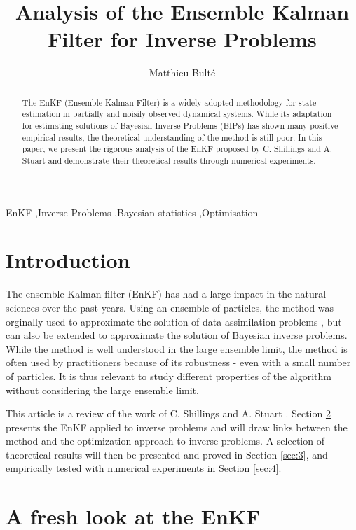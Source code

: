 \documentclass[a4paper,12pt]{elsarticle}
\begin{document}
\begin{frontmatter}

\title{Analysis of the Ensemble Kalman Filter for Inverse Problems}
\author{Matthieu Bulté}
\address{Technische Universität München}

\begin{abstract}
The EnKF (Ensemble Kalman Filter) is a widely adopted methodology
for state estimation in partially and noisily observed dynamical systems. While
its adaptation for estimating solutions of Bayesian Inverse Problems (BIPs)
has shown many positive empirical results, the theoretical understanding of
the method is still poor. In this paper, we present the rigorous analysis of
the EnKF proposed by C. Shillings and A. Stuart \cite{schillings2017analysis} and demonstrate their
theoretical results through numerical experiments.
\end{abstract}
\begin{keyword}
EnKF \sep Inverse Problems \sep Bayesian statistics \sep Optimisation
\end{keyword}
\end{frontmatter}

\section{Introduction} \label{sec:1} 
The ensemble Kalman filter (EnKF) has had a large impact in the
natural sciences over the past years. Using an ensemble of particles,
the method was orginally used to approximate the solution of data
assimilation problems \cite{iglesias2013ensemble}, but can also be extended to approximate
the solution of Bayesian inverse problems. While the method is well understood
in the large ensemble limit, the method is often used
by practitioners because of its robustness - even with a small number
of particles. It is thus relevant to study different properties of the
algorithm without considering the large ensemble limit.

This article is a review of the work of C. Shillings and A. Stuart \cite{schillings2017analysis}.
Section \ref{sec:2} presents the EnKF applied to inverse problems and will draw links
between the method and the optimization approach to inverse problems. A selection of theoretical
results will then be presented and proved in Section \ref{sec:3}, and empirically tested with numerical
experiments in Section \ref{sec:4}.

\section{A fresh look at the EnKF} \label{sec:2}
\end{document}
